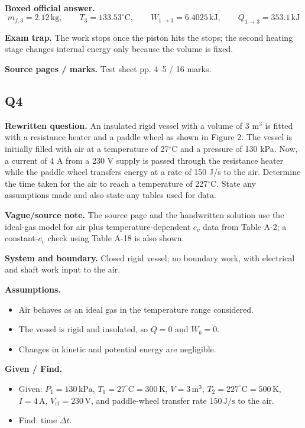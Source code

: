 \textbf{Boxed official answer.}
\[
\boxed{m_{f,3}=2.12\,\mathrm{kg},\qquad T_3=133.53^\circ\mathrm{C},\qquad W_{1\to3}=6.4025\,\mathrm{kJ},\qquad Q_{1\to3}=353.1\,\mathrm{kJ}}
\]

\textbf{Exam trap.} The work stops once the piston hits the stops; the second heating stage changes internal energy only because the volume is fixed.

\textbf{Source pages / marks.} Test sheet pp. 4--5 / 16 marks.


\subsection*{Q4}
\textbf{Rewritten question.} An insulated rigid vessel with a volume of 3 m$^3$ is fitted with a resistance heater and a paddle wheel as shown in Figure 2. The vessel is initially filled with air at a temperature of 27$^\circ$C and a pressure of 130 kPa. Now, a current of 4 A from a 230 V supply is passed through the resistance heater while the paddle wheel transfers energy at a rate of 150 J/s to the air. Determine the time taken for the air to reach a temperature of 227$^\circ$C. State any assumptions made and also state any tables used for data.

\textbf{Vague/source note.} The source page and the handwritten solution use the ideal-gas model for air plus temperature-dependent $c_v$ data from Table A-2; a constant-$c_v$ check using Table A-18 is also shown.

\textbf{System and boundary.} Closed rigid vessel; no boundary work, with electrical and shaft work input to the air.

\textbf{Assumptions.}
\begin{itemize}
  \item Air behaves as an ideal gas in the temperature range considered.
  \item The vessel is rigid and insulated, so $Q=0$ and $W_b=0$.
  \item Changes in kinetic and potential energy are negligible.
\end{itemize}

\textbf{Given / Find.}
\begin{itemize}
  \item Given: $P_1=130\,\mathrm{kPa}$, $T_1=27^\circ\mathrm{C}=300\,\mathrm{K}$, $V=3\,\mathrm{m^3}$, $T_2=227^\circ\mathrm{C}=500\,\mathrm{K}$, $I=4\,\mathrm{A}$, $V_{el}=230\,\mathrm{V}$, and paddle-wheel transfer rate $150\,\mathrm{J/s}$ to the air.
  \item Find: time $\Delta t$.
\end{itemize}

